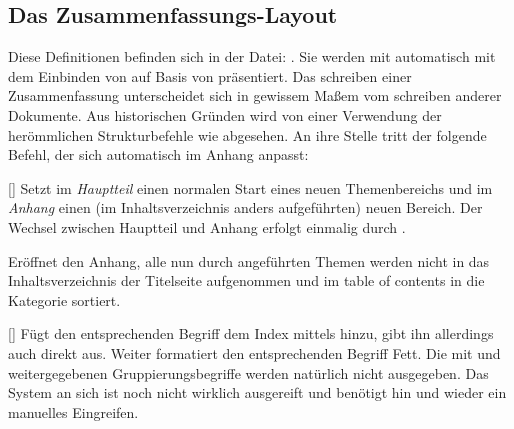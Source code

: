 %
%
%
%
%

\subsection{Das Zusammenfassungs-Layout}
Diese Definitionen befinden sich in der Datei: . Sie werden mit  automatisch mit dem Einbinden von  auf Basis von  präsentiert. \medskip\newline
Das schreiben einer Zusammenfassung unterscheidet sich in gewissem Maßem vom schreiben anderer Dokumente. Aus historischen Gründen wird von einer Verwendung der herömmlichen Strukturbefehle wie  abgesehen. An ihre Stelle tritt der folgende Befehl, der sich automatisch im Anhang anpasst:

%
%
%

[]
Setzt im \emph{Hauptteil} einen normalen Start eines neuen Themenbereichs und im \emph{Anhang} einen (im Inhaltsverzeichnis anders aufgeführten) neuen Bereich. Der Wechsel zwischen Hauptteil und Anhang erfolgt einmalig durch .

%
%
%

Eröffnet den Anhang, alle nun durch  angeführten Themen werden nicht in das Inhaltsverzeichnis der Titelseite aufgenommen und im table of contents in die Kategorie  sortiert.

%
%
%

[\cmdlist{}\cmdlist{}]
Fügt den entsprechenden Begriff dem Index mittels  hinzu, gibt ihn allerdings auch direkt aus. Weiter formatiert  den entsprechenden Begriff Fett. Die mit  und  weitergegebenen Gruppierungsbegriffe werden natürlich nicht ausgegeben. Das System an sich ist noch nicht wirklich ausgereift und benötigt hin und wieder ein manuelles Eingreifen.

%
%
%

